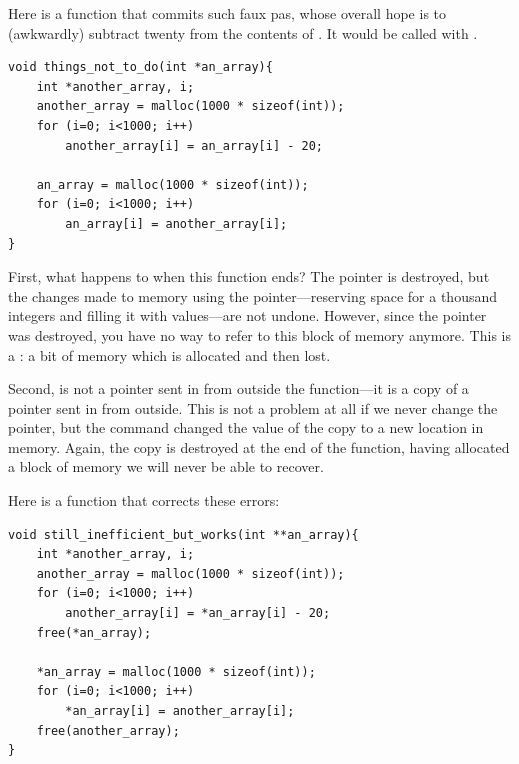 Here is a function that commits such faux pas,
whose overall hope is to (awkwardly) subtract twenty from
the contents of . It would be called with
.  
\begin{lstlisting}
void things_not_to_do(int *an_array){
    int *another_array, i;
    another_array = malloc(1000 * sizeof(int));
    for (i=0; i<1000; i++)
        another_array[i] = an_array[i] - 20;
    
    an_array = malloc(1000 * sizeof(int));
    for (i=0; i<1000; i++)
        an_array[i] = another_array[i];
}
\end{lstlisting}

First, what happens to  when this function
ends? The pointer is destroyed, but the changes made to memory using
the pointer---reserving space for a thousand integers and filling it
with values---are not undone. However, since the pointer was destroyed,
you have no way to refer to this block of memory anymore.  This is a
: a bit of memory which is allocated and then lost.

Second,  is not a pointer sent in from outside the
function---it is a copy of a pointer sent in from outside. This is not
a problem at all if we never change the pointer, but the command
 changed the value of the copy
 to a new location in memory.  Again, the copy is
destroyed at the end of the function, having allocated a block of memory
we will never be able to recover.

Here is a function that corrects these errors:

\begin{lstlisting}
void still_inefficient_but_works(int **an_array){
    int *another_array, i;
    another_array = malloc(1000 * sizeof(int));
    for (i=0; i<1000; i++)
        another_array[i] = *an_array[i] - 20;
    free(*an_array);

    *an_array = malloc(1000 * sizeof(int));
    for (i=0; i<1000; i++)
        *an_array[i] = another_array[i];
    free(another_array);
}
\end{lstlisting}


